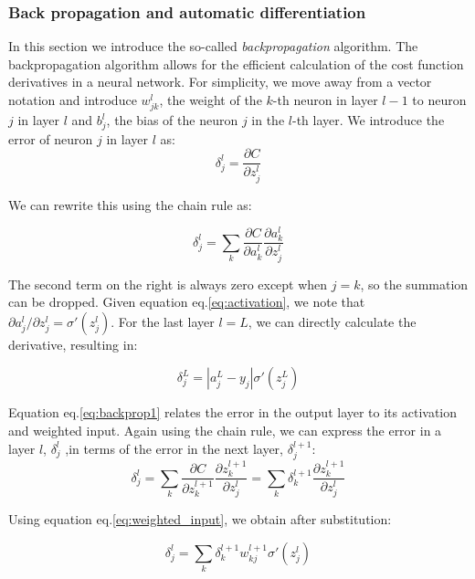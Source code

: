 \documentclass{Dissertate}
\begin{document}
\hypertarget{back-propagation-and-automatic-differentiation}{%
\subsubsection*{Back propagation and automatic
differentiation}\label{back-propagation-and-automatic-differentiation}}

In this section we introduce the so-called \emph{backpropagation}
algorithm. The backpropagation algorithm allows for the efficient
calculation of the cost function derivatives in a neural network. For
simplicity, we move away from a vector notation and introduce
\(w^l_{jk}\), the weight of the \(k\)-th neuron in layer \(l-1\) to
neuron \(j\) in layer \(l\) and \(b^l_j\), the bias of the neuron \(j\)
in the \(l\)-th layer. We introduce the error of neuron \(j\) in layer
\(l\) as: \[
\delta^l_j=\frac{\partial C}{\partial z^l_j}
\]

We can rewrite this using the chain rule as:

\[
\delta^l_j = \sum_k \frac{\partial C}{\partial a^l_{k}}\frac{\partial a^l_{k}}{\partial z^l_{j}}
\]

The second term on the right is always zero except when \(j=k\), so the
summation can be dropped. Given equation eq.\ref{eq:activation}, we
note that \(\partial a^l_{j}/\partial z^l_{j} = \sigma'(z^l_j)\). For
the last layer \(l = L\), we can directly calculate the derivative,
resulting in:

\begin{equation}
\delta^L_j =  |a^L_j-y_j|\sigma'(z^L_j)
\label{eq:backprop1}\end{equation}

Equation eq.\ref{eq:backprop1} relates the error in the output layer to
its activation and weighted input. Again using the chain rule, we can
express the error in a layer \(l\), \(\delta^{l}_j\) ,in terms of the
error in the next layer, \(\delta^{l+1}_j\): \[
\delta^l_j = \sum_k \frac{\partial C}{\partial z^{l+1}_{k}}\frac{\partial z^{l+1}_{k}}{\partial z^l_{j}} = \sum_k \delta^{l+1}_k\frac{\partial z^{l+1}_{k}}{\partial z^l_{j}}
\]

Using equation eq.\ref{eq:weighted_input}, we obtain after
substitution:

\begin{equation}
\delta^l_j = \sum_k\delta^{l+1}_kw^{l+1}_{kj}\sigma'(z^l_j)
\label{eq:backprop2}\end{equation}
\end{document}
